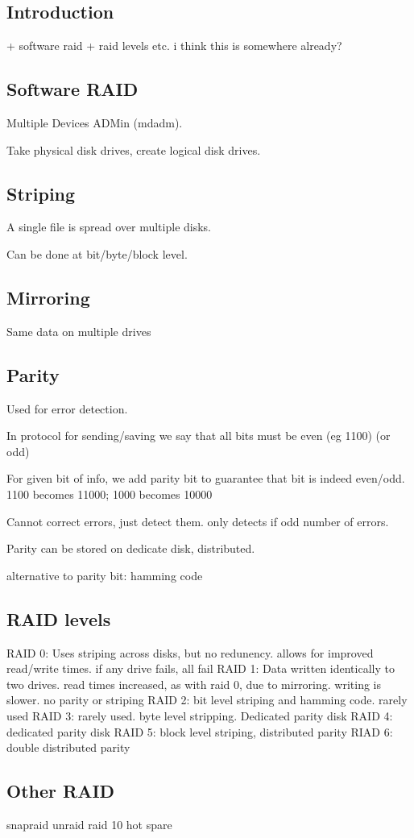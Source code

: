 
\subsection{Introduction}



+ software raid
+ raid levels etc. i think this is somewhere already?


\subsection{Software RAID}

Multiple Devices ADMin (mdadm).


Take physical disk drives, create logical disk drives.

\subsection{Striping}

A single file is spread over multiple disks.

Can be done at bit/byte/block level.

\subsection{Mirroring}

Same data on multiple drives

\subsection{Parity}

Used for error detection.

In protocol for sending/saving we say that all bits must be even (eg 1100) (or odd)

For given bit of info, we add parity bit to guarantee that bit is indeed even/odd. 1100 becomes 11000; 1000 becomes 10000

Cannot correct errors, just detect them. only detects if odd number of errors.

Parity can be stored on dedicate disk, distributed.

alternative to parity bit: hamming code

\subsection{RAID levels}

RAID 0: Uses striping across disks, but no redunency. allows for improved read/write times. if any drive fails, all fail
RAID 1: Data written identically to two drives. read times increased, as with raid 0, due to mirroring. writing is slower. no parity or striping
RAID 2: bit level striping and hamming code. rarely used
RAID 3: rarely used. byte level stripping. Dedicated parity disk
RAID 4: dedicated parity disk
RAID 5: block level striping, distributed parity
RIAD 6: double distributed parity

\subsection{Other RAID}

snapraid
unraid
raid 10
hot spare


